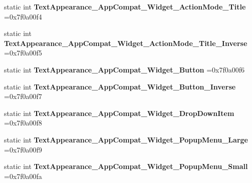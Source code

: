 \begin{DoxyCompactItemize}
\item 
\mbox{\label{classandroid_1_1support_1_1v7_1_1mediarouter_1_1R_1_1style_a7f3920e3a1526d352df5e85b0aa31262}} 
static int {\bfseries Text\+Appearance\+\_\+\+App\+Compat\+\_\+\+Widget\+\_\+\+Action\+Mode\+\_\+\+Title} =0x7f0a00f4
\item 
\mbox{\label{classandroid_1_1support_1_1v7_1_1mediarouter_1_1R_1_1style_aa1a53d1c949c00f3aea61ea55b07bdda}} 
static int {\bfseries Text\+Appearance\+\_\+\+App\+Compat\+\_\+\+Widget\+\_\+\+Action\+Mode\+\_\+\+Title\+\_\+\+Inverse} =0x7f0a00f5
\item 
\mbox{\label{classandroid_1_1support_1_1v7_1_1mediarouter_1_1R_1_1style_aea1cb8789bea17851fd6a69c11b88356}} 
static int {\bfseries Text\+Appearance\+\_\+\+App\+Compat\+\_\+\+Widget\+\_\+\+Button} =0x7f0a00f6
\item 
\mbox{\label{classandroid_1_1support_1_1v7_1_1mediarouter_1_1R_1_1style_ad26e4d9a917f1f4e361d01672d2e5263}} 
static int {\bfseries Text\+Appearance\+\_\+\+App\+Compat\+\_\+\+Widget\+\_\+\+Button\+\_\+\+Inverse} =0x7f0a00f7
\item 
\mbox{\label{classandroid_1_1support_1_1v7_1_1mediarouter_1_1R_1_1style_ad2335fec10de081447b5f52161ec5079}} 
static int {\bfseries Text\+Appearance\+\_\+\+App\+Compat\+\_\+\+Widget\+\_\+\+Drop\+Down\+Item} =0x7f0a00f8
\item 
\mbox{\label{classandroid_1_1support_1_1v7_1_1mediarouter_1_1R_1_1style_af265e731a6061d942750eb993be72541}} 
static int {\bfseries Text\+Appearance\+\_\+\+App\+Compat\+\_\+\+Widget\+\_\+\+Popup\+Menu\+\_\+\+Large} =0x7f0a00f9
\item 
\mbox{\label{classandroid_1_1support_1_1v7_1_1mediarouter_1_1R_1_1style_ae02a83b608404cd7b5dcd34bcf8b3bb7}} 
static int {\bfseries Text\+Appearance\+\_\+\+App\+Compat\+\_\+\+Widget\+\_\+\+Popup\+Menu\+\_\+\+Small} =0x7f0a00fa

\end{DoxyCompactItemize}
